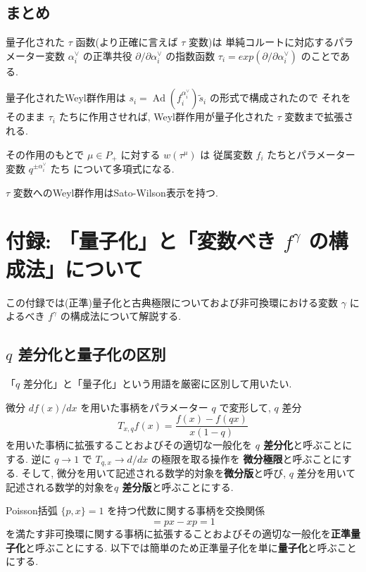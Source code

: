 \documentclass[12pt,twoside,dvipdfm]{msjproc}
\theoremstyle{definition} %
\theoremstyle{definition} %
\theoremstyle{definition} %
\numberwithin{theorem}{section}
\numberwithin{equation}{section}
\numberwithin{figure}{section}
\numberwithin{table}{section}
\newcommand\Ad{\mathop{\mathrm{Ad}}\nolimits}
\newcommand\ts{{\tilde{s}}}
\newcommand\av{\alpha^\vee}
\begin{document}
\subsection{まとめ}

量子化された $\tau$ 函数(より正確に言えば $\tau$ 変数)は
単純コルートに対応するパラメーター変数 $\av_i$ の正準共役 $\partial/\partial\av_i$
の指数函数 $\tau_i=exp(\partial/\partial\av_i)$ のことである.

量子化されたWeyl群作用は $s_i=\Ad(f_i^{\av_i})\ts_i$ の形式で構成されたので
それをそのまま $\tau_i$ たちに作用させれば, Weyl群作用が量子化された $\tau$ 
変数まで拡張される.

その作用のもとで $\mu\in P_+$ に対する $w(\tau^\mu)$ は
従属変数 $f_i$ たちとパラメーター変数 $q^{\pm\av_i}$ たち 
について多項式になる.

$\tau$ 変数へのWeyl群作用はSato-Wilson表示を持つ. 



\section{付録: 「量子化」と「変数べき $f^\gamma$ の構成法」について}

この付録では(正準)量子化と古典極限についておよび非可換環における変数 $\gamma$
によるべき $f^\gamma$ の構成法について解説する.


\subsection{$q$ 差分化と量子化の区別}
\label{sec:quantization}

「$q$ 差分化」と「量子化」という用語を厳密に区別して用いたい.

微分 $df(x)/dx$ を用いた事柄をパラメーター $q$ で変形して,  $q$ 差分
\begin{equation*}
 T_{x,q} f(x) = \frac{f(x)-f(qx)}{x(1-q)}
\end{equation*}
を用いた事柄に拡張することおよびその適切な一般化を {\bf $q$ 差分化}と呼ぶことにする.
逆に $q\to 1$ で $T_{q,x}\to d/dx$ の極限を取る操作を {\bf 微分極限}と呼ぶことにする.
そして, 微分を用いて記述される数学的対象を{\bf 微分版}と呼び, 
$q$ 差分を用いて記述される数学的対象を{\bf $q$ 差分版}と呼ぶことにする.



Poisson括弧 $\{p,x\}=1$ を持つ代数に関する事柄を交換関係
\begin{equation*}
 [p,x] = px - xp = 1
\end{equation*} 
を満たす非可換環に関する事柄に拡張することおよびその適切な一般化を{\bf 正準量子化}と呼ぶことにする.
以下では簡単のため正準量子化を単に{\bf 量子化}と呼ぶことにする.
\end{document}
